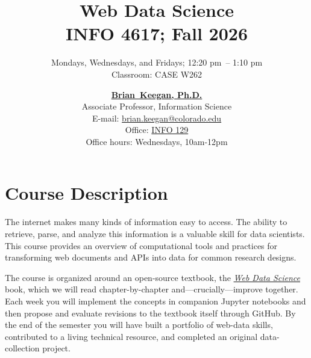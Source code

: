 \documentclass[11pt]{memoir}
\makeatletter
\def\coursename{Web Data Science}
\def\courselisting{INFO 4617}
\def\classroom{CASE W262}
\def\bookurl{https://github.com/cuinfoscience/Web-Data-Science-Book}
\def\meetingdays{Mondays, Wednesdays, and Fridays}
\def\starttime{12:20 pm}
\def\endtime{1:10 pm}
\def\meetingtimes{\starttime~-- \endtime}
\def\semester{Fall 2026}
\def\instructorfirstname{Brian}
\def\instructorlastname{Keegan}
\def\instructorfullname{\instructorfirstname~\instructorlastname, Ph.D.}
\def\instructortitle{Associate Professor, Information Science}
\def\instructoroffice{\href{https://www.colorado.edu/map/?id=336\#!m/193981}{INFO 129}}
\def\instructoremail{brian.keegan@colorado.edu}
\def\instructorwebsite{http://www.brianckeegan.com}
\def\instructorofficehours{Wednesdays, 10am-12pm}
\makeatother
\begin{document}
\nobibliography*


\title{
    \textbf{\huge{\coursename}}\\
    \vspace{5pt} \normalsize{\courselisting}; \semester
}

\author{
    \meetingdays; \meetingtimes\\
    Classroom: \classroom
}

\date{
    \normalsize{
        \href{\instructorwebsite}{\textbf{\instructorfullname}}\\
        \instructortitle\\
        E-mail: \href{mailto:\instructoremail}{\instructoremail}\\
        Office: \instructoroffice\\
        Office hours: \instructorofficehours
    }
}

\maketitle



\section{Course Description}

The internet makes many kinds of information easy to access. The ability to retrieve, parse, and analyze this information is a valuable skill for data scientists. This course provides an overview of computational tools and practices for transforming web documents and APIs into data for common research designs.

The course is organized around an open-source textbook, the \href{\bookurl}{\textit{Web Data Science}} book, which we will read chapter-by-chapter and---crucially---improve together. Each week you will implement the concepts in companion Jupyter notebooks and then propose and evaluate revisions to the textbook itself through GitHub. By the end of the semester you will have built a portfolio of web-data skills, contributed to a living technical resource, and completed an original data-collection project.
\end{document}
